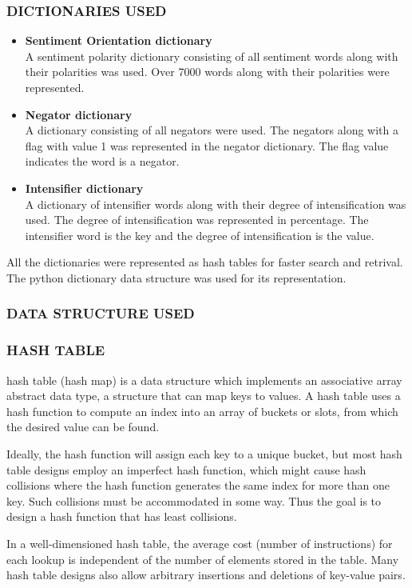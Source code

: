 \subsubsection{DICTIONARIES USED}
\begin{itemize}
	\item \textbf{Sentiment Orientation dictionary} \\
	A sentiment polarity dictionary consisting of all sentiment words along with their polarities was used. Over 7000 words along with their polarities were represented.
	\item \textbf{Negator dictionary} \\
	A dictionary consisting of all negators were used. The negators along with a flag with value 1 was represented in the negator dictionary. The flag value indicates the word is a negator.
	\item \textbf{Intensifier dictionary} \\
	A dictionary of intensifier words along with their degree of intensification was used. The degree of intensification was represented in percentage. The intensifier word is the key and the degree of intensification is the value.

\end{itemize}
All the dictionaries were represented as hash tables for faster search and retrival. The python dictionary data structure was used for its representation.
\subsubsection{DATA STRUCTURE USED}
\subsubsection{HASH TABLE}
hash table (hash map) is a data structure which implements an associative array abstract data type, a structure that can map keys to values. A hash table uses a hash function to compute an index into an array of buckets or slots, from which the desired value can be found.

Ideally, the hash function will assign each key to a unique bucket, but most hash table designs employ an imperfect hash function, which might cause hash collisions where the hash function generates the same index for more than one key. Such collisions must be accommodated in some way. Thus the goal is to design a hash function that has least collisions.

In a well-dimensioned hash table, the average cost (number of instructions) for each lookup is independent of the number of elements stored in the table. Many hash table designs also allow arbitrary insertions and deletions of key-value pairs.

